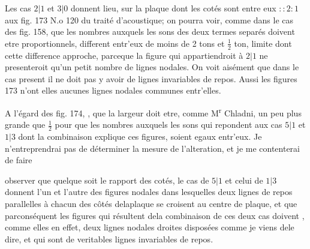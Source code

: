 \documentclass[11pt,a4paper]{article}
\begin{document}

Les cas $2|1$ et $3|0$ donnent lieu, sur la plaque dont les
cotés sont entre eux $::2:1$  aux fig. 173  N.o 120 du
traité d'acoustique; on pourra voir, comme dans le
cas des fig. 158, que les nombres  auxquels les sons
des deux termes separés doivent etre proportionnels,
different entr'eux de moins de 2 tons et $\frac{1}{2}$ ton,
limite dont cette difference approche, parceque
la figure qui appartiendroit à $2|1$ ne presenteroit
qu'un petit nombre de lignes nodales. On
voit aisément que dans le cas present il
ne doit pas y avoir de lignes invariables
de repos. Aussi les figures 173 n'ont elles
aucunes lignes nodales communes entr'elles.

A l'égard des fig. 174, , que la
largeur doit etre, comme   M\textsuperscript{r} Chladni,  un
peu plus grande que $\frac{1}{2}$ pour que les nombres
auxquels les sons qui  repondent aux cas
$5|1$ et $1|3$ dont la combinaison explique ces
figures, soient egaux entr'eux. Je n'entreprendrai
pas de déterminer  la mesure
de l'alteration, et je me contenterai de faire


observer que quelque soit le rapport des cotés, le cas de
$5|1$ et celui de $1|3$ donnent l'un et l'autre des figures
nodales dans lesquelles deux lignes de repos parallelles
à chacun des côtés delaplaque se croisent au centre
de  plaque, 
et que parconséquent les figures qui résultent dela
combinaison de ces deux cas doivent  , comme
elles   en effet, deux lignes nodales droites
 disposées comme je viens dele
dire, et qui sont de veritables lignes invariables de
repos.
\end{document}
